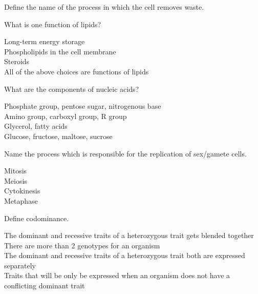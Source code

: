 \documentclass{exam}
\begin{document}
\begin{questions}
\vspace{20mm}

\question Define the name of the process in which the cell removes waste.

\vspace{20mm}

\question What is one function of lipids?

\begin{oneparchoices}
	\choice Long-term energy storage
	\\
	\choice Phospholipids in the cell membrane
	\\
	\choice Steroids
	\\
	\choice All of the above choices are functions of lipids
\end{oneparchoices}

\question What are the components of nucleic acids?

\begin{oneparchoices}
	\choice Phosphate group, pentose sugar, nitrogenous base
	\\
	\choice Amino group, carboxyl group, R group
	\\
	\choice Glycerol, fatty acids
	\\
	\choice Glucose, fructose, maltose, sucrose
\end{oneparchoices}

\question Name the process which is responsible for the replication of sex/gamete cells.

\begin{oneparchoices}
	\choice Mitosis
	\\
	\choice Meiosis
	\\
	\choice Cytokinesis
	\\
	\choice Metaphase
\end{oneparchoices}

\question Define codominance.

\begin{oneparchoices}
	\choice The dominant and recessive traits of a heterozygous trait gets blended together
	\\
	\choice There are more than 2 genotypes for an organism
	\\
	\choice The dominant and recessive traits of a heterozygous trait both are expressed separately
	\\
	\choice Traits that will be only be expressed when an organism does not have a conflicting dominant trait
\end{oneparchoices}


\end{questions}
\end{document}
